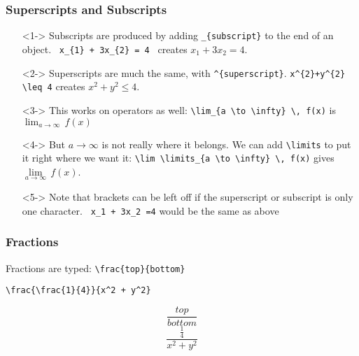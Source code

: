 \begin{frame}[fragile]
	\frametitle{Superscripts and Subscripts}
	\begin{itemize}
		\item[]<1-> Subscripts are produced by adding \verb|_{subscript}| to the end of an object. \verb| x_{1} + 3x_{2} = 4 | creates \( x_{1} + 3x_{2} = 4 \).
		\item[]<2-> Superscripts are much the same, with \verb|^{superscript}|. \verb|x^{2}+y^{2} \leq 4| creates \(x^2+y^2 \leq 4\).
		\item[]<3-> This works on operators as well: \verb|\lim_{a \to \infty} \, f(x)| is \(\lim_{a \to \infty} \, f(x)\)
		\item[]<4-> But \( a \to \infty \) is not really where it belongs. We can add \verb|\limits| to put it right where we want it: \verb|\lim \limits_{a \to \infty} \, f(x)| gives \(\lim \limits_{a \to \infty} \, f(x)\).
		\item[]<5-> Note that brackets can be left off if the superscript or subscript is only one character. \verb| x_1 + 3x_2 =4| would be the same as above	
	\end{itemize}
\end{frame}

\begin{frame}[fragile]
\frametitle{Fractions}
\begin{multicols}{2}
	Fractions are typed: \verb|\frac{top}{bottom}|
	
	\vspace{36pt}
	\verb|\frac{\frac{1}{4}}{x^2 + y^2}|
	
	\columnbreak
	
	\[ \frac{top}{bottom}\]
	\pause
	\[ \frac{\frac{1}{4}}{x^2 + y^2} \]

\end{multicols}
\end{frame}

